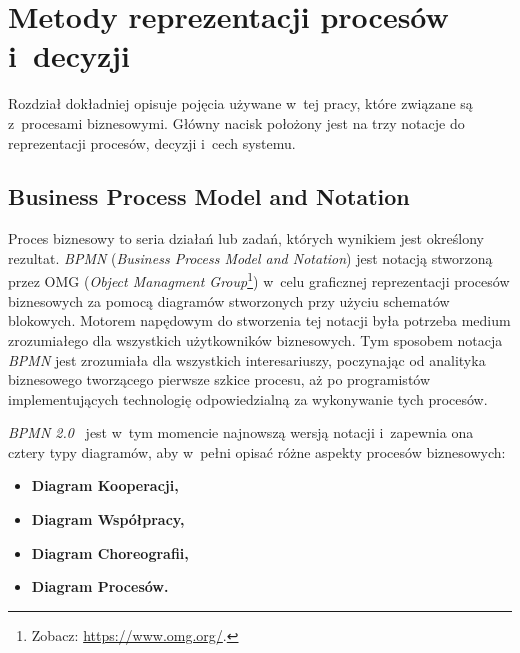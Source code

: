 \chapter{Metody reprezentacji procesów i~decyzji}
\label{cha:podłożeTeoretyczne}
Rozdział dokładniej opisuje pojęcia używane w~tej pracy, które związane są z~procesami biznesowymi. Główny nacisk położony jest na trzy notacje do reprezentacji procesów, decyzji i~cech systemu.

\section{Business Process Model and Notation}
\label{sec:bpmn}
Proces biznesowy to seria działań lub zadań, których wynikiem jest określony rezultat. \emph{BPMN} (\emph{Business Process Model and Notation}) jest notacją stworzoną przez OMG (\emph{Object Managment Group}\footnote{Zobacz: \url{https://www.omg.org/}.}) w~celu graficznej reprezentacji procesów biznesowych za pomocą diagramów stworzonych przy użyciu schematów blokowych. Motorem napędowym do stworzenia tej notacji była potrzeba medium zrozumiałego dla wszystkich użytkowników biznesowych. Tym sposobem notacja \emph{BPMN} jest zrozumiała dla wszystkich interesariuszy, poczynając od analityka biznesowego tworzącego pierwsze szkice procesu, aż po programistów implementujących technologię odpowiedzialną za wykonywanie tych procesów.

\emph{BPMN 2.0}~\cite{BPMN20} jest w~tym momencie najnowszą wersją notacji i~zapewnia ona cztery typy diagramów, aby w~pełni opisać różne aspekty procesów biznesowych:
\begin{itemize}
	\item \textbf{Diagram Kooperacji,}
	\item \textbf{Diagram Współpracy,}
	\item \textbf{Diagram Choreografii,}
	\item \textbf{Diagram Procesów.}
\end{itemize}

